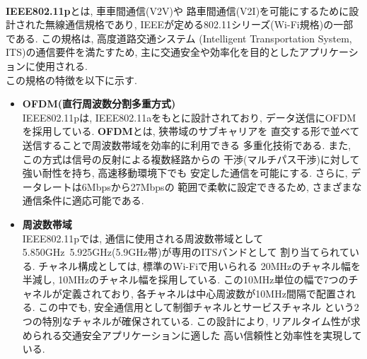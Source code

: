 \\[1em]
\indent \textbf{IEEE802.11p}とは, 車車間通信(V2V)や
路車間通信(V2I)を可能にするために設計された無線通信規格であり, 
IEEEが定める802.11シリーズ(Wi-Fi規格)の一部である. 
この規格は, 高度道路交通システム
(Intelligent Transportation System, ITS)の通信要件を満たすため, 
主に交通安全や効率化を目的としたアプリケーションに使用される.\\
\indent この規格の特徴を以下に示す. 
\begin{itemize}
  \item \textbf{OFDM(直行周波数分割多重方式)}\\
  \indent IEEE802.11pは, IEEE802.11aをもとに設計されており, 
  データ送信にOFDMを採用している. \textbf{OFDM}とは, 狭帯域のサブキャリアを
  直交する形で並べて送信することで周波数帯域を効率的に利用できる
  多重化技術である. また, この方式は信号の反射による複数経路からの
  干渉(マルチパス干渉)に対して強い耐性を持ち, 高速移動環境下でも
  安定した通信を可能にする. さらに, データレートは6Mbpsから27Mbpsの
  範囲で柔軟に設定できるため, さまざまな通信条件に適応可能である. 
  \item \textbf{周波数帯域}\\
  \indent IEEE802.11pでは, 通信に使用される周波数帯域として
  5.850GHz~5.925GHz(5.9GHz帯)が専用のITSバンドとして
  割り当てられている. チャネル構成としては, 標準のWi-Fiで用いられる
  20MHzのチャネル幅を半減し, 10MHzのチャネル幅を採用している. 
  この10MHz単位の幅で7つのチャネルが定義されており, 
  各チャネルは中心周波数が10MHz間隔で配置される. 
  この中でも, 安全通信用として制御チャネルとサービスチャネル
  という2つの特別なチャネルが確保されている. この設計により, 
  リアルタイム性が求められる交通安全アプリケーションに適した
  高い信頼性と効率性を実現している. 
\end{itemize}
